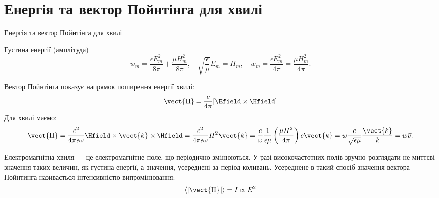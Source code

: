 \documentclass[onlytextwidth]{beamer}
\begin{document}
\section{Енергія та вектор Пойнтінга для хвилі}





\begin{frame}{Енергія та вектор Пойнтінга для хвилі}{}
	\begin{block}{}\justifying

		Густина енергії (амплітуда)
		\begin{equation*}
			w_m = \frac{\epsilon E_m^2}{8\pi} + \frac{\mu H_m^2}{8\pi}, \quad  \sqrt{\frac{\epsilon}{\mu}} E_m = H_m, \quad w_m = \frac{\epsilon
				E_m^2}{4\pi} = \frac{\mu H_m^2}{4\pi}.
		\end{equation*}
	\end{block}
	\begin{block}{}\justifying
		Вектор Пойнтінга показує напрямок поширення енергії хвилі:
		\begin{equation*}
			\vect{\Pi} = \frac{c}{4\pi}[\Efield\times\Hfield]
		\end{equation*}
		Для хвилі маємо:
		\begin{equation*}
			\vect{\Pi} =  \frac{c^2}{4\pi\epsilon \omega} \Hfield\times\vect{k}\times\Hfield = \frac{c^2}{4\pi\epsilon \omega} H^2 \vect{k} =
			\frac{c}{\omega} \frac{1}{\epsilon\mu}\left( \frac{\mu H^2}{4\pi}\right)   c \vect{k} = w \frac{c}{\sqrt{\epsilon\mu}}
			\frac{\vect{k}}{k}= w
			\vec{v}.
		\end{equation*}
	\end{block}
	\begin{block}{}\justifying\small
		Електромагнітна хвиля --- це електромагнітне поле, що періодично змінюються. У разі високочастотних полів зручно розглядати не миттєві значення
		таких величин, як густина енергії, а значення, усереднені за період коливань. Усереднене в такий спосіб значення вектора Пойнтинга називається
		\alert{інтенсивністю випромінювання}:
		\begin{equation*}
			\left\langle |\vect{\Pi}| \right\rangle = I \propto E^2
		\end{equation*}
	\end{block}
\end{frame}
\end{document}
